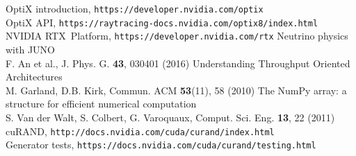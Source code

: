 \documentclass{webofc}
\begin{document}
\begin{thebibliography}{}
\hspace*{0.0em}OptiX introduction, {\tt https://developer.nvidia.com/optix}\\
\hspace*{0.0em}OptiX API, {\tt https://raytracing-docs.nvidia.com/optix8/index.html}
%
NVIDIA RTX\texttrademark\, Platform, {\tt https://developer.nvidia.com/rtx}
Neutrino physics with JUNO \\
F. An et al., J. Phys. G. {\bf 43}, 030401 (2016) 
Understanding Throughput Oriented Architectures \\
M. Garland, D.B. Kirk, Commun. ACM {\bf 53}(11), 58 (2010) 
The NumPy array: a structure for efficient numerical computation \\
S. Van der Walt, S. Colbert, G. Varoquaux, Comput. Sci. Eng. {\bf 13}, 22 (2011)
%
cuRAND, {\tt http://docs.nvidia.com/cuda/curand/index.html}\\
\hspace*{0.0em}Generator tests, {\tt https://docs.nvidia.com/cuda/curand/testing.html}\\
\hspace*{0.0em}{\tt https://docs.nvidia.com/cuda/curand/device-api-overview.html\#performance-notes}
%
%
\end{thebibliography}
%
\end{document}
